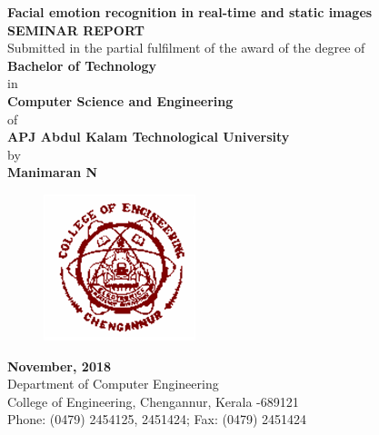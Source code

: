\documentclass[a4paper,12pt,oneside]{article}
\begin{document}
\thispagestyle{empty}
\begin{center}

\large{\textbf{Facial emotion recognition in real-time and static
images}
\setlength{\baselineskip}{1.5\baselineskip}}
\\

\vspace{5mm}
\textbf{SEMINAR REPORT}
\\
\vspace{3mm}
Submitted in the partial fulfilment of the award of the degree
of
\vspace{3mm}
\\
\textbf{Bachelor of Technology}
\\
\vspace{3mm}
in
\\
\vspace{3mm}
\textbf{Computer Science and Engineering}
\\
\vspace{3mm}
of
\\
\vspace{3mm}
\textbf{APJ Abdul Kalam Technological University}
\\
\vspace{3mm}
by
\\
\vspace{3mm}
\textbf{Manimaran N}
\\
\vspace{5mm}
\begin{figure}[H]
	\centering
	\includegraphics{ceclogo.png}
\end{figure}
\vspace{25mm}
\textbf{November, 2018}
\vspace{8mm}
\\
\vspace{2mm}
Department of Computer Engineering
\\
\vspace{2mm}
College of Engineering, Chengannur, Kerala -689121
\\
\vspace{2mm}
Phone: (0479) 2454125, 2451424; Fax: (0479) 2451424
\\


\end{center}
\end{document}
